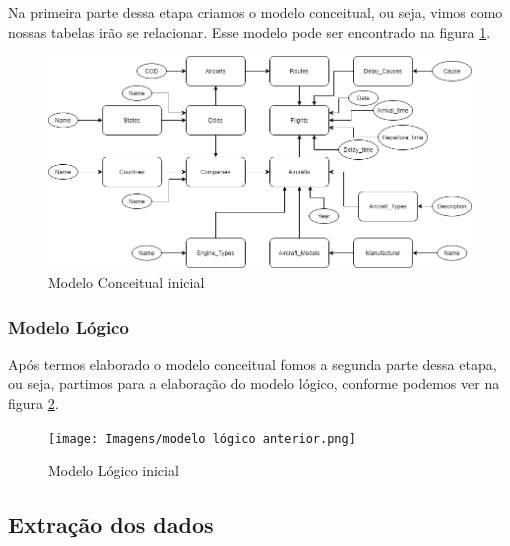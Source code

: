 \documentclass{article}
\begin{document}
	Na primeira parte dessa etapa criamos o modelo conceitual, ou seja, vimos como nossas tabelas irão se relacionar. Esse modelo pode ser encontrado na figura \ref{conceitual}.
	\begin{figure}
		\centering
		\includegraphics[scale = 0.5]{Imagens/modelo conceitual anterior.png}
		\caption{Modelo Conceitual inicial}
		\label{conceitual}
	\end{figure}
	
	\subsubsection{Modelo Lógico}
	
	Após termos elaborado o modelo conceitual fomos a segunda parte dessa etapa, ou seja, partimos para a elaboração do modelo lógico, conforme podemos ver na figura \ref{lógico}.
	\begin{figure}
		\centering
		\texttt{[image: Imagens/modelo lógico anterior.png]}
		\caption{Modelo Lógico inicial}
		\label{lógico}
	\end{figure}
	
	\subsection{Extração dos dados}
	
\end{document}
